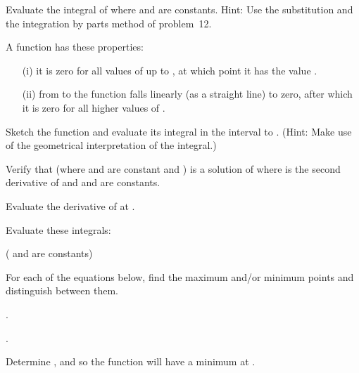 {\begin{two-digit-list}
\item [15.] Evaluate the integral of  where  and  are
constants.
Hint: Use the substitution  and the integration by parts method of
problem~12.
\item [16.] A function  has these properties:
\begin{itemize}
\item [(i)] it is zero for all values of  up to , at which point it has
the value .
\item [(ii)] from  to  the function falls linearly (as a
straight line) to zero, after which it is zero for all higher values of .
\end{itemize}
Sketch the function and evaluate its integral in the interval  to
.
(Hint: Make use of the geometrical interpretation of the integral.)
\item [17.] Verify that  (where 
and  are constant and ) is a solution of
%
%
where  is the second derivative of  and  and  are
constants.
\item [18.] Evaluate the derivative of  at .
\item [19.] Evaluate these integrals:
\begin{one-digit-list}
\item [a.]  \qquad ( and  are constants) 
\item [b.] 
\end{one-digit-list}

\item [20.] For each of the equations below, find the maximum and/or minimum
points and distinguish between them.
\begin{one-digit-list}
\item [a.] .
\item [b.] .
\item [c.] Determine ,  and  so the function  will
have a minimum at .
\end{one-digit-list}
\end{two-digit-list}

\BriefAns
\begin{two-digit-list}
\item [3.] 


\end{two-digit-list}}
